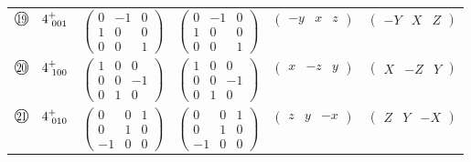 \documentclass[fleqn,10pt,landscape]{jsarticle}
\begin{document}
\begin{center}
\begin{longtable}{lcccc}
$ {\ooalign{\hfil\resizebox{.8\width}{\height}{19}\hfil\crcr\raise.1ex\hbox{\large$\bigcirc$}}}\quad 4^{+}_{\,\,001} $ & $ \begin{pmatrix} 0 & -1 & 0 \\ 1 & 0 & 0 \\ 0 & 0 & 1 \end{pmatrix} $ & $ \begin{pmatrix} 0 & -1 & 0 \\ 1 & 0 & 0 \\ 0 & 0 & 1 \end{pmatrix} $ & $ \begin{pmatrix} - y & x & z \end{pmatrix} $ & $ \begin{pmatrix} - Y & X & Z \end{pmatrix} $ \\
$ {\ooalign{\hfil\resizebox{.8\width}{\height}{20}\hfil\crcr\raise.1ex\hbox{\large$\bigcirc$}}}\quad 4^{+}_{\,\,100} $ & $ \begin{pmatrix} 1 & 0 & 0 \\ 0 & 0 & -1 \\ 0 & 1 & 0 \end{pmatrix} $ & $ \begin{pmatrix} 1 & 0 & 0 \\ 0 & 0 & -1 \\ 0 & 1 & 0 \end{pmatrix} $ & $ \begin{pmatrix} x & - z & y \end{pmatrix} $ & $ \begin{pmatrix} X & - Z & Y \end{pmatrix} $ \\
$ {\ooalign{\hfil\resizebox{.8\width}{\height}{21}\hfil\crcr\raise.1ex\hbox{\large$\bigcirc$}}}\quad 4^{+}_{\,\,010} $ & $ \begin{pmatrix} 0 & 0 & 1 \\ 0 & 1 & 0 \\ -1 & 0 & 0 \end{pmatrix} $ & $ \begin{pmatrix} 0 & 0 & 1 \\ 0 & 1 & 0 \\ -1 & 0 & 0 \end{pmatrix} $ & $ \begin{pmatrix} z & y & - x \end{pmatrix} $ & $ \begin{pmatrix} Z & Y & - X \end{pmatrix} $ \\

\end{longtable}
\end{center}
\end{document}
